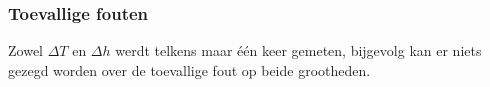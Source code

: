 \subsubsection{Toevallige fouten}


Zowel $\Delta T$ en $\Delta h$ werdt telkens maar \'e\'en keer gemeten, bijgevolg kan er niets gezegd worden over de toevallige fout op beide grootheden.
\\

